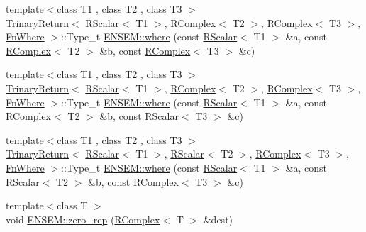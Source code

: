 \begin{DoxyCompactItemize}
\item 
{\footnotesize template$<$class T1 , class T2 , class T3 $>$ }\\\mbox{\hyperlink{structENSEM_1_1TrinaryReturn}{Trinary\+Return}}$<$ \mbox{\hyperlink{classENSEM_1_1RScalar}{R\+Scalar}}$<$ T1 $>$, \mbox{\hyperlink{classENSEM_1_1RComplex}{R\+Complex}}$<$ T2 $>$, \mbox{\hyperlink{classENSEM_1_1RComplex}{R\+Complex}}$<$ T3 $>$, \mbox{\hyperlink{structENSEM_1_1FnWhere}{Fn\+Where}} $>$\+::Type\+\_\+t \mbox{\hyperlink{group__rcomplex_ga1cdf9105d38ae9d995cba5874914982d}{E\+N\+S\+E\+M\+::where}} (const \mbox{\hyperlink{classENSEM_1_1RScalar}{R\+Scalar}}$<$ T1 $>$ \&a, const \mbox{\hyperlink{classENSEM_1_1RComplex}{R\+Complex}}$<$ T2 $>$ \&b, const \mbox{\hyperlink{classENSEM_1_1RComplex}{R\+Complex}}$<$ T3 $>$ \&c)
\item 
{\footnotesize template$<$class T1 , class T2 , class T3 $>$ }\\\mbox{\hyperlink{structENSEM_1_1TrinaryReturn}{Trinary\+Return}}$<$ \mbox{\hyperlink{classENSEM_1_1RScalar}{R\+Scalar}}$<$ T1 $>$, \mbox{\hyperlink{classENSEM_1_1RComplex}{R\+Complex}}$<$ T2 $>$, \mbox{\hyperlink{classENSEM_1_1RComplex}{R\+Complex}}$<$ T3 $>$, \mbox{\hyperlink{structENSEM_1_1FnWhere}{Fn\+Where}} $>$\+::Type\+\_\+t \mbox{\hyperlink{group__rcomplex_gadf07511990ea74c6e0d3b72f19e880f3}{E\+N\+S\+E\+M\+::where}} (const \mbox{\hyperlink{classENSEM_1_1RScalar}{R\+Scalar}}$<$ T1 $>$ \&a, const \mbox{\hyperlink{classENSEM_1_1RComplex}{R\+Complex}}$<$ T2 $>$ \&b, const \mbox{\hyperlink{classENSEM_1_1RScalar}{R\+Scalar}}$<$ T3 $>$ \&c)
\item 
{\footnotesize template$<$class T1 , class T2 , class T3 $>$ }\\\mbox{\hyperlink{structENSEM_1_1TrinaryReturn}{Trinary\+Return}}$<$ \mbox{\hyperlink{classENSEM_1_1RScalar}{R\+Scalar}}$<$ T1 $>$, \mbox{\hyperlink{classENSEM_1_1RScalar}{R\+Scalar}}$<$ T2 $>$, \mbox{\hyperlink{classENSEM_1_1RComplex}{R\+Complex}}$<$ T3 $>$, \mbox{\hyperlink{structENSEM_1_1FnWhere}{Fn\+Where}} $>$\+::Type\+\_\+t \mbox{\hyperlink{group__rcomplex_ga69c3ed4f12ac9e2b1fcba29be62f0622}{E\+N\+S\+E\+M\+::where}} (const \mbox{\hyperlink{classENSEM_1_1RScalar}{R\+Scalar}}$<$ T1 $>$ \&a, const \mbox{\hyperlink{classENSEM_1_1RScalar}{R\+Scalar}}$<$ T2 $>$ \&b, const \mbox{\hyperlink{classENSEM_1_1RComplex}{R\+Complex}}$<$ T3 $>$ \&c)
\item 
{\footnotesize template$<$class T $>$ }\\void \mbox{\hyperlink{group__rcomplex_gaf64745e6e9f179738a187230acf6b2ea}{E\+N\+S\+E\+M\+::zero\+\_\+rep}} (\mbox{\hyperlink{classENSEM_1_1RComplex}{R\+Complex}}$<$ T $>$ \&dest)

\end{DoxyCompactItemize}
